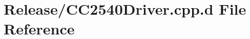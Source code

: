 \hypertarget{_release_2_c_c2540_driver_8cpp_8d}{\section{\-Release/\-C\-C2540\-Driver.cpp.\-d \-File \-Reference}
\label{_release_2_c_c2540_driver_8cpp_8d}
}
